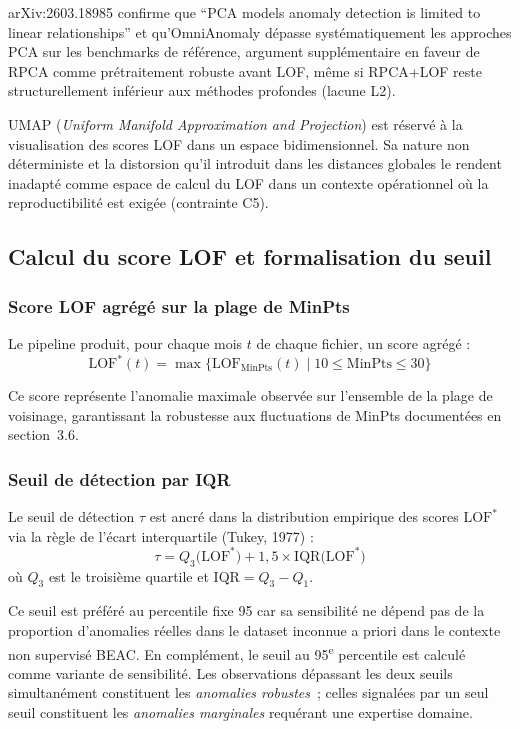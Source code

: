 \documentclass[12pt,a4paper]{article}
\begin{document}
arXiv:2603.18985 confirme que ``PCA models anomaly detection is limited to
linear relationships'' et qu'OmniAnomaly dépasse systématiquement les
approches PCA sur les benchmarks de référence, argument supplémentaire en
faveur de RPCA comme prétraitement robuste avant LOF, même si RPCA+LOF
reste structurellement inférieur aux méthodes profondes (lacune L2).

UMAP (\textit{Uniform Manifold Approximation and Projection}) est réservé à
la visualisation des scores LOF dans un espace bidimensionnel. Sa nature non
déterministe et la distorsion qu'il introduit dans les distances globales le
rendent inadapté comme espace de calcul du LOF dans un contexte opérationnel
où la reproductibilité est exigée (contrainte C5).

\subsection{Calcul du score LOF et formalisation du seuil}

\subsubsection{Score LOF agrégé sur la plage de MinPts}

Le pipeline produit, pour chaque mois $t$ de chaque fichier, un score agrégé :
$$\mathrm{LOF}^*(t) = \max \bigl\{
\mathrm{LOF}_{\mathrm{MinPts}}(t) \mid
10 \leq \mathrm{MinPts} \leq 30
\bigr\}$$

Ce score représente l'anomalie maximale observée sur l'ensemble de la plage
de voisinage, garantissant la robustesse aux fluctuations de MinPts
documentées en section~3.6.

\subsubsection{Seuil de détection par IQR}

Le seuil de détection $\tau$ est ancré dans la distribution empirique des
scores $\mathrm{LOF}^*$ via la règle de l'écart interquartile (Tukey, 1977) :
$$\tau = Q_3\!\bigl(\mathrm{LOF}^*\bigr)
+ 1{,}5 \times \mathrm{IQR}\!\bigl(\mathrm{LOF}^*\bigr)$$
où $Q_3$ est le troisième quartile et $\mathrm{IQR} = Q_3 - Q_1$.

Ce seuil est préféré au percentile fixe 95 car sa sensibilité ne dépend pas
de la proportion d'anomalies réelles dans le dataset  inconnue a priori
dans le contexte non supervisé BEAC. En complément, le seuil au
95\textsuperscript{e} percentile est calculé comme variante de sensibilité.
Les observations dépassant les deux seuils simultanément constituent les
\textit{anomalies robustes}~; celles signalées par un seul seuil constituent
les \textit{anomalies marginales} requérant une expertise domaine.
\end{document}
